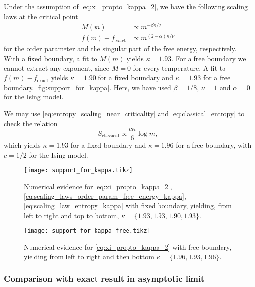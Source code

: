 Under the assumption of \autoref{eq:xi_propto_kappa_2}, we have the following scaling laws at the critical point
\begin{align}\label{eq:scaling_laws_order_param_free_energy_kappa}
  M(m) & \propto m^{-\beta \kappa / \nu} \\
  f(m) - f_{\text{exact}} & \propto m^{(2-\alpha)\kappa / \nu}
\end{align}
for the order parameter and the singular part of the free energy, respectively.
With a fixed boundary, a fit to $M(m)$ yields $\kappa = 1.93$.
For a free boundary we cannot extract any exponent, since $M = 0$ for every temperature.
A fit to $f(m) - f_{\text{exact}}$ yields $\kappa = 1.90$ for a fixed boundary and $\kappa = 1.93$ for a free boundary.
\autoref{fig:support_for_kappa}. Here, we have used $\beta = 1/8$, $\nu = 1$ and $\alpha = 0$ for the Ising model.

We may use \autoref{eq:entropy_scaling_near_criticality} and \autoref{eq:classical_entropy} to check the
relation
\begin{equation}\label{eq:scaling_law_entropy_kappa}
  S_{\text{classical}} \propto \frac{c\kappa}{6}\log m,
\end{equation}
which yields $\kappa = 1.93$ for a fixed boundary and $\kappa = 1.96$ for a free boundary,
with $c = 1/2$ for the Ising model.

\begin{figure}
  \texttt{[image: support\_for\_kappa.tikz]}
  \caption{Numerical evidence for \autoref{eq:xi_propto_kappa_2}, \autoref{eq:scaling_laws_order_param_free_energy_kappa},
  \autoref{eq:scaling_law_entropy_kappa} with fixed boundary, yielding, from left to right and top to bottom, $\kappa = \{ 1.93, 1.93, 1.90,
  1.93 \}$.}\label{fig:support_for_kappa}
\end{figure}

\begin{figure}
  \texttt{[image: support\_for\_kappa\_free.tikz]}
  \caption{Numerical evidence for \autoref{eq:xi_propto_kappa_2} with free boundary,
  yielding from left to right and then bottom $\kappa = \{ 1.96,
  1.93, 1.96 \}$.}\label{fig:support_for_kappa_free} \end{figure}

\subsubsection{Comparison with exact result in asymptotic limit}

